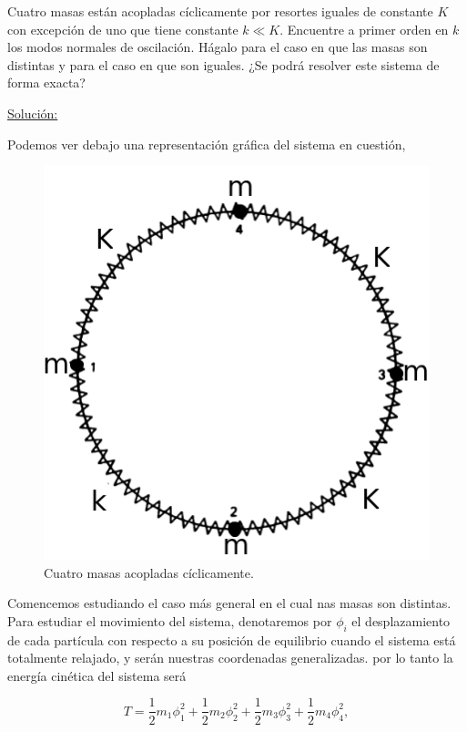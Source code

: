 \documentclass[a4paper,10pt]{article}
\numberwithin{equation}{section}
\begin{document}
Cuatro masas están acopladas cíclicamente por resortes iguales de constante $K$ con 
excepción de uno que tiene constante $k \ll K$. Encuentre a primer orden en $k$ los 
modos normales de oscilación. Hágalo para el caso en que las masas son distintas 
y para el caso en que son iguales. ¿Se podrá resolver este sistema de forma exacta?

\vspace{.3cm}

\underline{Solución:} \vspace{.3cm}

Podemos ver debajo una representación gráfica del sistema en cuestión,

\begin{figure}[H]
\center 
\includegraphics[scale=0.5]{problema2fig1}
 \caption{Cuatro masas acopladas cíclicamente.}
 \label{fig:problema2fig1}
\end{figure}

Comencemos estudiando el caso más general en el cual nas masas son distintas. 
Para estudiar el movimiento del sistema, denotaremos por $\phi_i$ el desplazamiento de cada 
partícula con respecto a su posición de equilibrio cuando el sistema está totalmente 
relajado, y serán nuestras coordenadas generalizadas.  por lo tanto la energía cinética 
del sistema será

\begin{equation}
 T = \frac{1}{2}m_1\phi_{1}^2 + \frac{1}{2}m_2\phi_{2}^2 + 
 \frac{1}{2}m_3\phi_{3}^2 + \frac{1}{2}m_4\phi_{4}^2,
\end{equation}
\end{document}
